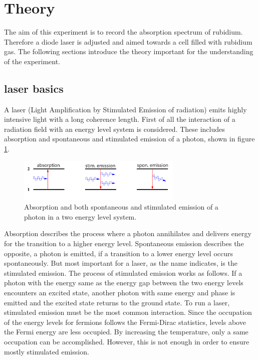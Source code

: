 \section{Theory}
\label{sec:theory}
The aim of this experiment is to record the absorption spectrum
of rubidium. Therefore a diode laser is adjusted and aimed towards a cell
filled with rubidium gas.
The following sections introduce the theory
important for the understanding of the experiment.

\subsection{laser basics}
\label{subsec:laser}
A laser (Light Amplification by Stimulated Emission of radiation)
emits highly intensive light with a long coherence length.
First of all the interaction of a radiation field with
an energy level system is considered. These includes
absorption and spontaneous and stimulated emission
of a photon, shown in figure \ref{fig:ab_em}.
\begin{figure}
\centering
\includegraphics[width=0.7\textwidth]{ab_und_emiss.png}
\caption{Absorption and both spontaneous and stimulated emission of a photon in a two energy level system.
\cite{V61}}
\label{fig:ab_em}
\end{figure}
Absorption describes the process where a photon annihilates and
delivers energy for the transition
to a higher energy level.
Spontaneous emission describes the opposite, a photon is
emitted, if a transition to a lower energy
level occurs spontaneously.
But most important for a laser, as the name indicates,
is the stimulated emission.
The process of stimulated emission works as follows.
If a photon with the energy same as
the energy gap between the two energy levels
encounters an excited state, another photon with
same energy and phase is emitted and the excited state
returns to the ground state.
To run a laser, stimulated emission must be the most common interaction.
Since the occupation of the energy levels for fermions follows
the Fermi-Dirac statistics, %
levels above the Fermi energy are
less occupied. By increasing the temperature, only
a same occupation can be accomplished.
However, this is not enough in order to ensure mostly stimulated emission.
